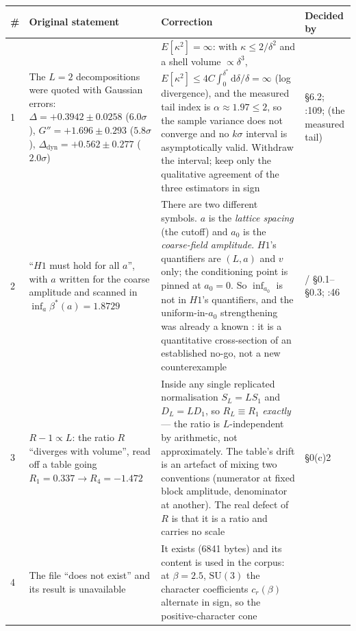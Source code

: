 \vspace{0.2em}
{\footnotesize
\begin{longtable}{@{}L{0.4cm}L{3.7cm}L{6.3cm}L{3.9cm}@{}}
\toprule
\textbf{\#} & \textbf{Original statement} & \textbf{Correction} & \textbf{Decided by} \\
\midrule
{} & The $L=2$ decompositions were quoted with Gaussian errors: $\Delta=+0.3942\pm0.0258$
    ($6.0\sigma$), $G''=+1.696\pm0.293$ ($5.8\sigma$), $\Delta_{\mathrm{dyn}}=+0.562\pm0.277$
    ($2.0\sigma$)
  & $E[\kappa^{2}]=\infty$: with $\kappa\le2/\delta^{2}$ and a shell volume $\propto\delta^{3}$,
    $E[\kappa^{2}]\le4C\int_0^{\delta^{*}}\mathrm{d}\delta/\delta=\infty$ (log divergence), and
    the measured tail index is $\alpha\approx1.97\le2$, so the sample variance does not converge
    and no $k\sigma$ interval is asymptotically valid. Withdraw the interval; keep only the
    qualitative agreement of the three estimators in sign
  & \LT{}  \S6.2; :109; 
    (the measured tail) \\
2 & ``$H1$ must hold for all $a$'', with $a$ written for the coarse amplitude and scanned in
    $\inf_a\beta^{*}(a)=1.8729$
  & There are two different symbols. $a$ is the \emph{lattice spacing} (the cutoff) and $a_0$ is
    the \emph{coarse-field amplitude}. $H1$'s quantifiers are $(L,a)$ and $v$ only; the
    conditioning point is pinned at $a_0=0$. So $\inf_{a_0}$ is not in $H1$'s quantifiers, and the
    uniform-in-$a_0$ strengthening was already a known \LN{}: it is a quantitative cross-section
    of an established no-go, not a new counterexample
  & \LT{}/\LN{}  \S0.1--\S0.3; :46 \\
3 & $R-1\propto L$: the ratio $R$ ``diverges with volume'', read off a table going
    $R_1=0.337\to R_4=-1.472$
  & Inside any single replicated normalisation $S_L=LS_1$ and $D_L=LD_1$, so $R_L\equiv R_1$
    \emph{exactly} --- the ratio is $L$-independent by arithmetic, not approximately. The table's
    drift is an artefact of mixing two conventions (numerator at fixed block amplitude,
    denominator at another). The real defect of $R$ is that it is a ratio and carries no scale
  & \LT{}  \S0(c)2 \\
4 & The file  ``does not exist'' and its result is unavailable
  & It exists (6841 bytes) and its content is used in the corpus: at $\beta=2.5$, $\mathrm{SU}(3)$
    the character coefficients $c_r(\beta)$ alternate in sign, so the positive-character cone

\end{longtable}}

